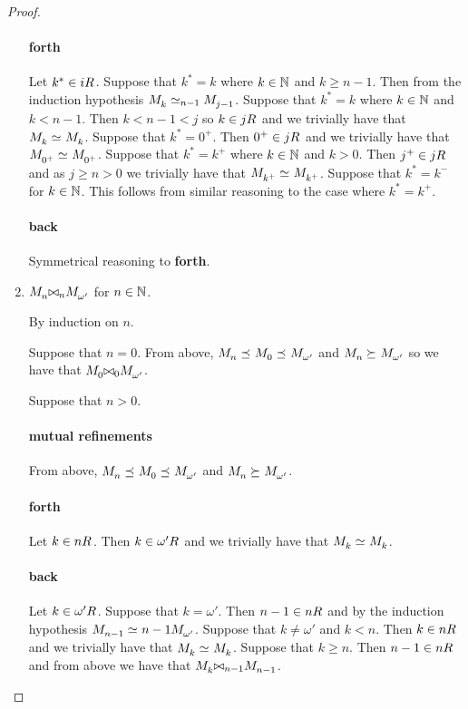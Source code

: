 \begin{proof}
\begin{enumerate}
    \paragraph{forth} Let $k^* \in \kSuccessors{}{i}$.
    Suppose that $k^* = k$ where $k \in \mathbb{N}$ and $k \geq n - 1$.
    Then from the induction hypothesis $\kPModel{k} \bisimilar [n-1] \kPModel{j - 1}$.
    Suppose that $k^* = k$ where $k \in \mathbb{N}$ and $k < n - 1$.
    Then $k < n - 1 < j$ so $k \in \kSuccessors{}{j}$ and we trivially have that $\kPModel{k} \bisimilar \kPModel{k}$.
    Suppose that $k^* = 0^+$.
    Then $0^+ \in \kSuccessors{}{j}$ and we trivially have that $\kPModel{0^+} \bisimilar \kPModel{0^+}$.
    Suppose that $k^* = k^+$ where $k \in \mathbb{N}$ and $k > 0$.
    Then $j^+ \in \kSuccessors{}{j}$ and as $j \geq n > 0$ we trivially have that $\kPModel{k^+} \bisimilar \kPModel{k^+}$.
    Suppose that $k^* = k^-$ for $k \in \mathbb{N}$. This follows from similar reasoning to the case where $k^* = k^+$.

    \paragraph{back} Symmetrical reasoning to {\bf forth}.

    \item $\kPModel{n} \bisimref[n] \kPModel{\omega'}$ for $n \in \mathbb{N}$.

    By induction on $n$.

    Suppose that $n = 0$. 
    From above, $\kPModel{n} \refines \kPModel{0} \refines \kPModel{\omega'}$
    and $\kPModel{n} \simulates \kPModel{\omega'}$
    so we have that $\kPModel{0} \bisimref[0] \kPModel{\omega'}$.

    Suppose that $n > 0$.

    \paragraph{mutual refinements} From above, $\kPModel{n} \refines \kPModel{0} \refines \kPModel{\omega'}$
    and $\kPModel{n} \simulates \kPModel{\omega'}$.

    \paragraph{forth} Let $k \in \kSuccessors{}{n}$. 
    Then $k \in \kSuccessors{}{\omega'}$ and we trivially have that $\kPModel{k} \bisimilar \kPModel{k}$.

    \paragraph{back} Let $k \in \kSuccessors{}{\omega'}$. 
    Suppose that $k = \omega'$. 
    Then $n - 1 \in \kSuccessors{}{n}$ 
    and by the induction hypothesis $\kPModel{n - 1} \bisimilar{n - 1} \kPModel{\omega'}$.
    Suppose that $k \neq \omega'$ and $k < n$. Then $k \in \kSuccessors{}{n}$ and we trivially have that $\kPModel{k} \bisimilar \kPModel{k}$.
    Suppose that $k \geq n$. Then $n - 1 \in \kSuccessors{}{n}$ and from above we have that $\kPModel{k} \bisimref[n - 1] \kPModel{n - 1}$.
    

\end{enumerate}
\end{proof}
